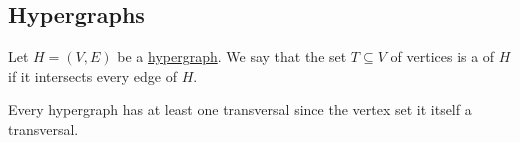 \subsection{Hypergraphs}\label{subsec:hypergraphs}

\begin{definition}\label{def:graph/hypergraph_transversal}
  Let \( H = (V, E) \) be a \hyperref[def:graph/hypergraph]{hypergraph}. We say that the set \( T \subseteq V \) of vertices is a  of \( H \) if it intersects every edge of \( H \).
\end{definition}

\begin{example}\label{ex:hypergraph_vertex_set_is_transversal}
  Every hypergraph has at least one transversal since the vertex set it itself a transversal.
\end{example}

